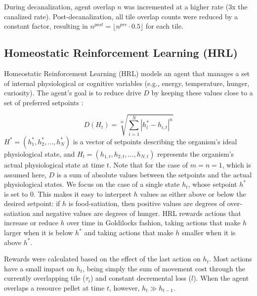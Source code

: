 During decanalization, agent overlap \(n\) was incremented at a higher rate (3x the canalized rate). Post-decanalization, all tile overlap counts were reduced by a constant factor, resulting in \(n^{post} = \lfloor n^{pre} \cdot 0.5 \rfloor\) for each tile.

\subsection{Homeostatic Reinforcement Learning (HRL)}

Homeostatic Reinforcement Learning (HRL) models an agent that manages a set of internal physiological or cognitive variables (e.g., energy, temperature, hunger, curiosity). The agent's goal is to reduce drive $D$ by keeping these values close to a set of preferred setpoints \cite{keramati_homeostatic_2014}:

\begin{equation}\label{eq:model-drive}
    D\left(H_t\right)=\sqrt[m]{\sum_{i=1}^N\left|h_i^*-h_{i, t}\right|^n}
\end{equation}
\(H^*=\left(h_1^*, h_2^*, \ldots, h_N^*\right)\) is a vector of setpoints describing the organism's ideal physiological state, and \(H_t=\left(h_{1, t}, h_{2, t}, \ldots, h_{N, t}\right)\) represents the organism's actual physiological state at time \(t\). Note that for the case of $m = n = 1$, which is assumed here, $D$ is a sum of absolute values between the setpoints and the actual physiological states. We focus on the case of a single state \(h_t\), whose setpoint \(h^*\) is set to \(0\). This makes it easy to interpret $h$ values as either above or below the desired setpoint: if $h$ is food-satiation, then positive values are degrees of over-satiation and negative values are degrees of hunger. HRL rewards actions that increase or reduce $h$ over time in Goldilocks fashion, taking actions that make $h$ larger when it is below \(h^*\) and taking actions that make $h$ smaller when it is above \(h^*\).

Rewards were calculated based on the effect of the last action on \(h_t\). Most actions have a small impact on \(h_t\), being simply the sum of movement cost through the currently overlapping tile (\(\tau_i
\)) and constant decremental loss (\(l\)). When the agent overlaps a resource pellet at time \(t\), however, \(h_{t} \gg h_{t-1}\).

